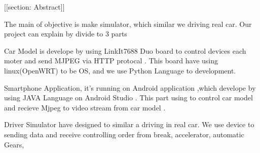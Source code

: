 [[section: Abstract]]

    The main of objective is make simulator, which similar we driving real car. Our  project can explain by divide to 3 parts

Car Model is develope by using LinkIt7688 Duo board to control devices each moter and send MJPEG via HTTP protocal . This board have using linux(OpenWRT) to be OS, and we use Python Language to development.

Smartphone Application, it's running on Android application ,which develope by using JAVA Language on Android Studio . This part using to control car model and recieve Mjpeg to video stream from car model .

Driver Simulator have designed to similar a driving in real car. We use device to sending data and receive controlling order from break, accelerator, automatic Gears,


